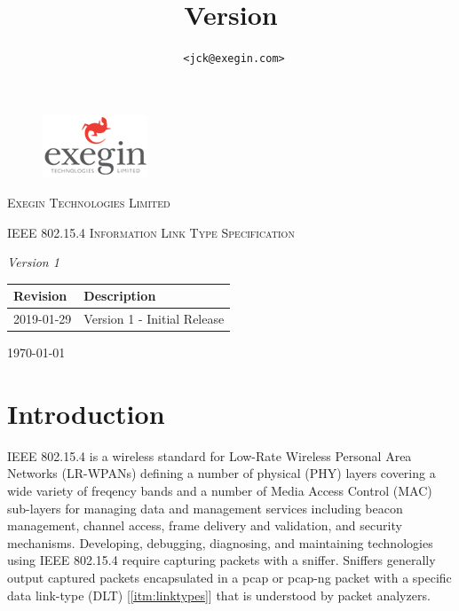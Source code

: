 \documentclass[12pt]{article}
\title{
\maintitle
\\\company
\\\hfill\\\normalsize Version \versionnumber
}
\author{\authorname~\tt{<jck@exegin.com>}}
\newcommand\versionnumber{1}
\renewcommand\_{\textunderscore\allowbreak}
\begin{document}
\begin{titlepage}
    \vspace{5cm}
    \begin{figure}
        \includegraphics[scale=1]{exegin.png}
    \end{figure}
    \vspace{2cm}
    {\scshape\LARGE Exegin Technologies Limited \par}
    \vspace{5cm}
    {\scshape\Large IEEE 802.15.4 Information Link Type Specification\par}
    {\itshape Version \versionnumber}
    \vspace{2cm}
    \vfill

    \vfill

\begin{tabular}{ |p{3cm}|p{12cm}| }
\hline
\textbf{Revision}   &  \textbf{Description}\\
\hline
    2019-01-29 & Version 1 - Initial Release\\
\hline
\end{tabular}

    {\large \today\par}
\end{titlepage}

\newpage
\tableofcontents

\newpage
\section{Introduction}\label{sec:intro}
IEEE 802.15.4 is a wireless standard for Low-Rate Wireless Personal Area
Networks (LR-WPANs) defining a number of physical (PHY) layers covering a wide
variety of freqency bands and a number of Media Access Control (MAC) sub-layers
for managing data and management services including beacon management, channel
access, frame delivery and validation, and security mechanisms.  Developing,
debugging, diagnosing, and maintaining technologies using IEEE 802.15.4
require capturing packets with a sniffer. Sniffers generally output captured packets
encapsulated in a pcap or pcap-ng packet with a specific data link-type (DLT)
[\ref{itm:linktypes}] that is understood by packet analyzers.
\end{document}
